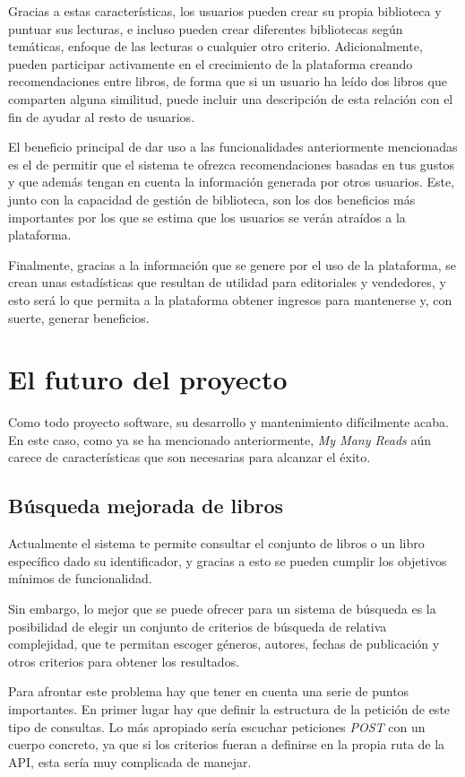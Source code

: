 Gracias a estas características, los usuarios pueden crear su propia biblioteca y puntuar sus lecturas, e incluso pueden crear diferentes bibliotecas según temáticas, enfoque de las lecturas o cualquier otro criterio. Adicionalmente, pueden participar activamente en el crecimiento de la plataforma creando recomendaciones entre libros, de forma que si un usuario ha leído dos libros que comparten alguna similitud, puede incluir una descripción de esta relación con el fin de ayudar al resto de usuarios.

El beneficio principal de dar uso a las funcionalidades anteriormente mencionadas es el de permitir que el sistema te ofrezca recomendaciones basadas en tus gustos y que además tengan en cuenta la información generada por otros usuarios. Este, junto con la capacidad de gestión de biblioteca, son los dos beneficios más importantes por los que se estima que los usuarios se verán atraídos a la plataforma.

Finalmente, gracias a la información que se genere por el uso de la plataforma, se crean unas estadísticas que resultan de utilidad para editoriales y vendedores, y esto será lo que permita a la plataforma obtener ingresos para mantenerse y, con suerte, generar beneficios.

\section{El futuro del proyecto}

Como todo proyecto software, su desarrollo y mantenimiento difícilmente acaba. En este caso, como ya se ha mencionado anteriormente, \textit{My Many Reads} aún carece de características que son necesarias para alcanzar el éxito.

\subsection{Búsqueda mejorada de libros}

Actualmente el sistema te permite consultar el conjunto de libros o un libro específico dado su identificador, y gracias a esto se pueden cumplir los objetivos mínimos de funcionalidad.

Sin embargo, lo mejor que se puede ofrecer para un sistema de búsqueda es la posibilidad de elegir un conjunto de criterios de búsqueda de relativa complejidad, que te permitan escoger géneros, autores, fechas de publicación y otros criterios para obtener los resultados.

Para afrontar este problema hay que tener en cuenta una serie de puntos importantes. En primer lugar hay que definir la estructura de la petición de este tipo de consultas. Lo más apropiado sería escuchar peticiones \textit{POST} con un cuerpo concreto, ya que si los criterios fueran a definirse en la propia ruta de la API, esta sería muy complicada de manejar.

